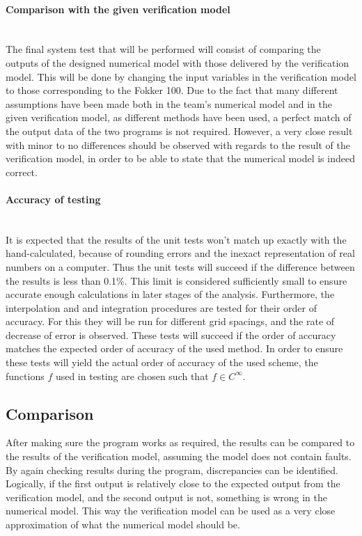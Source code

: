 \paragraph{Comparison with the given verification model}\mbox{}\\
\noindent The final system test that will be performed will consist of comparing the outputs of the designed numerical model with those delivered by the verification model. This will be done by changing the input variables in the verification model to those corresponding to the Fokker 100. Due to the fact that many different assumptions have been made both in the team's numerical model and in the given verification model, as different methods have been used, a perfect match of the output data of the two programs is not required. However, a very close result with minor to no differences should be observed with regards to the result of the verification model, in order to be able to state that the numerical model is indeed correct. 


\paragraph{Accuracy of testing}\mbox{}\\
\noindent It is expected that the results of the unit tests won't match up exactly with the hand-calculated, because of rounding errors and the inexact representation of real numbers on a computer. Thus the unit tests will succeed if the difference between the results is less than 0.1\%. This limit is considered sufficiently small to ensure accurate enough calculations in later stages of the analysis. Furthermore, the interpolation and and integration procedures are tested for their order of accuracy. For this they will be run for different grid spacings, and the rate of decrease of error is observed. These tests will succeed if the order of accuracy matches the expected order of accuracy of the used method. In order to ensure these tests will yield the actual order of accuracy of the used scheme, the functions $f$ used in testing are chosen such that $f \in C^{\infty}$. 

\subsection{Comparison}
After making sure the program works as required, the results can be compared to the results of the verification model, assuming the model does not contain faults. By again checking results during the program, discrepancies can be identified. Logically, if the first output is relatively close to the expected output from the verification model, and the second output is not, something is wrong in the numerical model. This way the verification model can be used as a very close approximation of what the numerical model should be.
